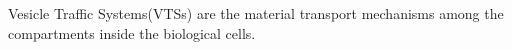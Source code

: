 Vesicle Traffic Systems(VTSs) are the material transport 
mechanisms among the compartments inside the biological cells.

